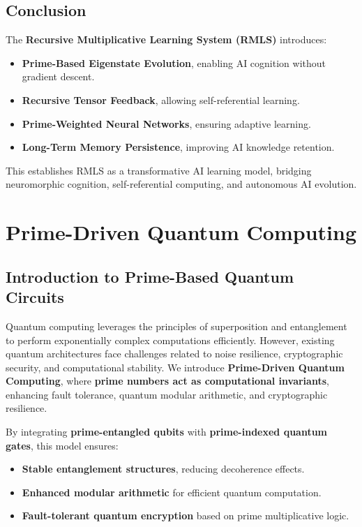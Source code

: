 \documentclass{article}
\theoremstyle{plain}
\theoremstyle{plain}
\theoremstyle{definition}
\theoremstyle{remark}
\begin{document}
\subsection{Conclusion}

The \textbf{Recursive Multiplicative Learning System (RMLS)} introduces:
\begin{itemize}
    \item \textbf{Prime-Based Eigenstate Evolution}, enabling AI cognition without gradient descent.
    \item \textbf{Recursive Tensor Feedback}, allowing self-referential learning.
    \item \textbf{Prime-Weighted Neural Networks}, ensuring adaptive learning.
    \item \textbf{Long-Term Memory Persistence}, improving AI knowledge retention.
\end{itemize}

This establishes RMLS as a transformative AI learning model, bridging neuromorphic cognition, self-referential computing, and autonomous AI evolution.
\section{Prime-Driven Quantum Computing}

\subsection{Introduction to Prime-Based Quantum Circuits}

Quantum computing leverages the principles of superposition and entanglement to perform exponentially complex computations efficiently. However, existing quantum architectures face challenges related to noise resilience, cryptographic security, and computational stability. We introduce \textbf{Prime-Driven Quantum Computing}, where \textbf{prime numbers act as computational invariants}, enhancing fault tolerance, quantum modular arithmetic, and cryptographic resilience.

By integrating \textbf{prime-entangled qubits} with \textbf{prime-indexed quantum gates}, this model ensures:
\begin{itemize}
    \item \textbf{Stable entanglement structures}, reducing decoherence effects.
    \item \textbf{Enhanced modular arithmetic} for efficient quantum computation.
    \item \textbf{Fault-tolerant quantum encryption} based on prime multiplicative logic.
\end{itemize}
\end{document}
